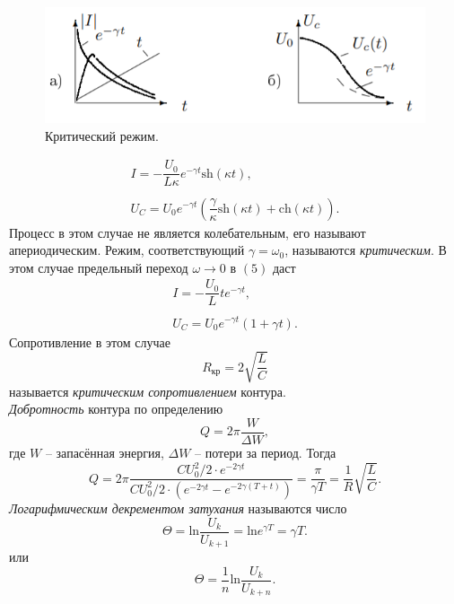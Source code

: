 \documentclass[a4paper,12pt]{article}
\begin{document}
\begin{figure}
\includegraphics[scale=0.7]{4.png}
\caption{Критический режим.}
\vspace{-40pt}
\end{figure}
$$
\begin{array}{c}
I = -\dfrac{U_0}{L\kappa}e^{-\gamma t}\text{sh}(\kappa t),\\
\\
U_C = U_0 e^{-\gamma t}\left( \dfrac{\gamma}{\kappa}\text{sh}(\kappa t) + \text{ch}(\kappa t) \right).
\end{array}
$$
Процесс в этом случае не является колебательным, его называют апериодическим. Режим, соответствующий $\gamma = \omega_0$, называются \textit{критическим}. В этом случае предельный переход $\omega \rightarrow 0$ в $(5)$ даст 
$$
\begin{array}{c}
I = -\dfrac{U_0}{L}te^{-\gamma t},\\
\\
U_C=U_0 e^{-\gamma t}(1+\gamma t).
\end{array}
$$
Сопротивление в этом случае 
\begin{equation}
R_{\text{кр}}= 2 \sqrt{\dfrac{L}{C}}
\end{equation}
называется \textit{критическим сопротивлением} контура.\\
\textit{Добротность} контура по определению 
$$
Q = 2\pi \dfrac{W}{\Delta W},
$$ 
где $W$ -- запасённая энергия, $\Delta W$ -- потери за период. Тогда
\begin{equation}
Q = 2\pi\dfrac{CU_0^2/2 \cdot e^{-2\gamma t}}{CU_0^2/2 \cdot (e^{-2\gamma t} - e^{-2\gamma (T+t)})}=\dfrac{\pi}{\gamma T}=\dfrac{1}{R}\sqrt{\dfrac{L}{C}}.
\end{equation}
\textit{Логарифмическим декрементом затухания} называются число
\begin{equation}
\Theta = \text{ln}\dfrac{U_k}{U_{k+1}}=\text{ln} e^{\gamma T}=\gamma T.
\end{equation}
или 
\begin{equation}
\Theta = \dfrac{1}{n} \text{ln}\dfrac{U_k}{U_{k+n}}.
\end{equation}
\end{document}
